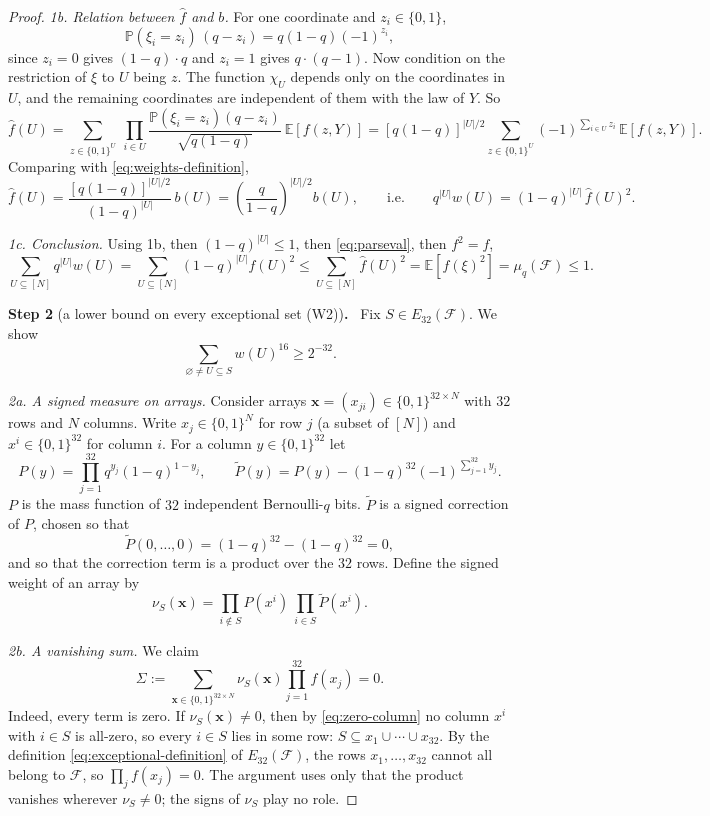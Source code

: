 \documentclass[11pt,letterpaper]{article}
\theoremstyle{definition}
\theoremstyle{remark}
\numberwithin{equation}{section}
\newcommand{\step}[2]{\medskip\noindent\textbf{Step #1} (#2)\textbf{.}\ }
\begin{document}
\begin{proof}
\emph{1b. Relation between $\widehat f$ and $b$.}
For one coordinate and $z_i\in\{0,1\}$,
\[
 \mathbb P(\xi_i=z_i)\,(q-z_i)=q(1-q)(-1)^{z_i},
\]
since $z_i=0$ gives $(1-q)\cdot q$ and $z_i=1$ gives $q\cdot(q-1)$.
Now condition on the restriction of $\xi$ to $U$ being $z$. The function
$\chi_U$ depends only on the coordinates in $U$, and the remaining
coordinates are independent of them with the law of $Y$. So
\[
 \widehat f(U)
 =\sum_{z\in\{0,1\}^U}\ \prod_{i\in U}
 \frac{\mathbb P(\xi_i=z_i)(q-z_i)}{\sqrt{q(1-q)}}\ \mathbb E[f(z,Y)]
 =[q(1-q)]^{|U|/2}
 \sum_{z\in\{0,1\}^{U}}(-1)^{\sum_{i\in U}z_i}\,
 \mathbb E[f(z,Y)] .
\]
Comparing with \eqref{eq:weights-definition},
\[
\widehat f(U)=\frac{[q(1-q)]^{|U|/2}}{(1-q)^{|U|}}\,b(U)
=\left(\frac{q}{1-q}\right)^{|U|/2}b(U),
\qquad\text{i.e.}\qquad
q^{|U|}w(U)=(1-q)^{|U|}\,\widehat f(U)^2 .
\]

\emph{1c. Conclusion.} Using 1b, then $(1-q)^{|U|}\le1$, then
\eqref{eq:parseval}, then $f^2=f$,
\[
 \sum_{U\subseteq[N]}q^{|U|}w(U)
 =\sum_{U\subseteq[N]}(1-q)^{|U|}\widehat f(U)^2
 \le\sum_{U\subseteq[N]}\widehat f(U)^2
 =\mathbb E[f(\xi)^2]
 =\mu_q(\mathcal F)\le1 .
\]

\step{2}{a lower bound on every exceptional set \textup{(W2)}}
Fix $S\in E_{32}(\mathcal F)$. We show
\begin{equation}\label{eq:exceptional-weight-bound}
 \sum_{\varnothing\ne U\subseteq S}w(U)^{16}\ge2^{-32}.
\end{equation}

\emph{2a. A signed measure on arrays.}
Consider arrays $\mathbf x=(x_{ji})\in\{0,1\}^{32\times N}$ with $32$ rows
and $N$ columns. Write $x_j\in\{0,1\}^N$ for row $j$ (a subset of $[N]$)
and $x^i\in\{0,1\}^{32}$ for column $i$. For a column
$y\in\{0,1\}^{32}$ let
\[
 P(y)=\prod_{j=1}^{32}q^{y_j}(1-q)^{1-y_j},
 \qquad
 \widetilde P(y)=P(y)-(1-q)^{32}(-1)^{\sum_{j=1}^{32}y_j}.
\]
$P$ is the mass function of $32$ independent Bernoulli-$q$ bits.
$\widetilde P$ is a signed correction of $P$, chosen so that
\begin{equation}\label{eq:zero-column}
\widetilde P(0,\ldots,0)=(1-q)^{32}-(1-q)^{32}=0,
\end{equation}
and so that the correction term is a product over the $32$ rows.
Define the signed weight of an array by
\[
\nu_S(\mathbf x)=\prod_{i\notin S}P(x^i)\ \prod_{i\in S}\widetilde P(x^i).
\]

\emph{2b. A vanishing sum.} We claim
\begin{equation}\label{eq:vanishing}
 \Sigma:=\sum_{\mathbf x\in\{0,1\}^{32\times N}}\nu_S(\mathbf x)
 \prod_{j=1}^{32}f(x_j)=0 .
\end{equation}
Indeed, every term is zero. If $\nu_S(\mathbf x)\ne0$, then by
\eqref{eq:zero-column} no column $x^i$ with $i\in S$ is all-zero, so every
$i\in S$ lies in some row: $S\subseteq x_1\cup\cdots\cup x_{32}$. By the
definition \eqref{eq:exceptional-definition} of $E_{32}(\mathcal F)$, the
rows $x_1,\ldots,x_{32}$ cannot all belong to $\mathcal F$, so
$\prod_jf(x_j)=0$. The argument uses only that the product vanishes
wherever $\nu_S\ne0$; the signs of $\nu_S$ play no role.


\end{proof}
\end{document}
